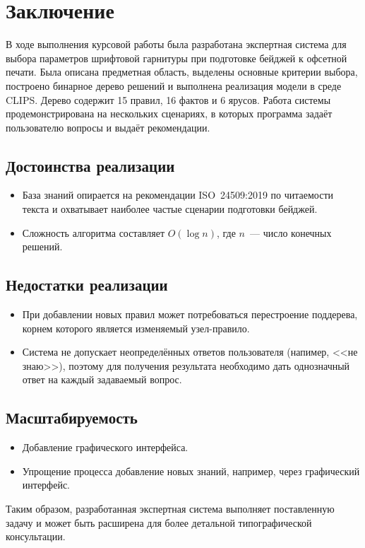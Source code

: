 \section*{Заключение}

В ходе выполнения курсовой работы была разработана экспертная система для выбора параметров шрифтовой гарнитуры при подготовке бейджей к офсетной печати. Была описана предметная область, выделены основные критерии выбора, построено бинарное дерево решений и выполнена реализация модели в среде CLIPS. Дерево содержит 15 правил, 16 фактов и 6 ярусов. Работа системы продемонстрирована на нескольких сценариях, в которых программа задаёт пользователю вопросы и выдаёт рекомендации.

\subsection*{Достоинства реализации}

\begin{itemize}
    \item База знаний опирается на рекомендации ISO~24509:2019 по читаемости текста и охватывает наиболее частые сценарии подготовки бейджей.
    \item Сложность алгоритма составляет $O(\log n)$, где $n$~--- число конечных решений.
\end{itemize}

\subsection*{Недостатки реализации}

\begin{itemize}
    \item При добавлении новых правил может потребоваться перестроение поддерева, корнем которого является изменяемый узел-правило.
    \item Система не допускает неопределённых ответов пользователя (напимер, <<не знаю>>), поэтому для получения результата необходимо дать однозначный ответ на каждый задаваемый вопрос.
\end{itemize}

\subsection*{Масштабируемость}

\begin{itemize}
    \item Добавление графического интерфейса.
    \item Упрощение процесса добавление новых знаний, например, через графический интерфейс.
\end{itemize}

Таким образом, разработанная экспертная система выполняет поставленную задачу и может быть расширена для более детальной типографической консультации.
